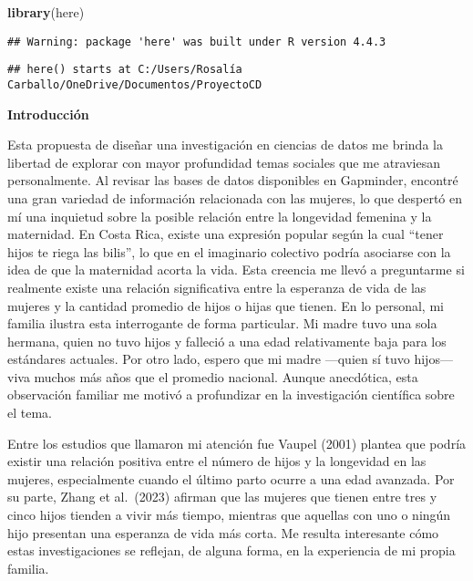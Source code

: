 \documentclass[
]{article}
\newenvironment{Shaded}{\begin{snugshade}}{\end{snugshade}}
\newcommand{\FunctionTok}[1]{\textcolor[rgb]{0.13,0.29,0.53}{\textbf{#1}}}
\newcommand{\NormalTok}[1]{#1}
\begin{document}
\begin{Shaded}
\begin{Highlighting}[]
\FunctionTok{library}\NormalTok{(here)}
\end{Highlighting}
\end{Shaded}

\begin{verbatim}
## Warning: package 'here' was built under R version 4.4.3
\end{verbatim}

\begin{verbatim}
## here() starts at C:/Users/Rosalía Carballo/OneDrive/Documentos/ProyectoCD
\end{verbatim}

\textbf{Introducción}

Esta propuesta de diseñar una investigación en ciencias de datos me
brinda la libertad de explorar con mayor profundidad temas sociales que
me atraviesan personalmente. Al revisar las bases de datos disponibles
en Gapminder, encontré una gran variedad de información relacionada con
las mujeres, lo que despertó en mí una inquietud sobre la posible
relación entre la longevidad femenina y la maternidad. En Costa Rica,
existe una expresión popular según la cual ``tener hijos te riega las
bilis'', lo que en el imaginario colectivo podría asociarse con la idea
de que la maternidad acorta la vida. Esta creencia me llevó a
preguntarme si realmente existe una relación significativa entre la
esperanza de vida de las mujeres y la cantidad promedio de hijos o hijas
que tienen. En lo personal, mi familia ilustra esta interrogante de
forma particular. Mi madre tuvo una sola hermana, quien no tuvo hijos y
falleció a una edad relativamente baja para los estándares actuales. Por
otro lado, espero que mi madre ---quien sí tuvo hijos--- viva muchos más
años que el promedio nacional. Aunque anecdótica, esta observación
familiar me motivó a profundizar en la investigación científica sobre el
tema.

Entre los estudios que llamaron mi atención fue Vaupel (2001) plantea
que podría existir una relación positiva entre el número de hijos y la
longevidad en las mujeres, especialmente cuando el último parto ocurre a
una edad avanzada. Por su parte, Zhang et al.~(2023) afirman que las
mujeres que tienen entre tres y cinco hijos tienden a vivir más tiempo,
mientras que aquellas con uno o ningún hijo presentan una esperanza de
vida más corta. Me resulta interesante cómo estas investigaciones se
reflejan, de alguna forma, en la experiencia de mi propia familia.
\end{document}
